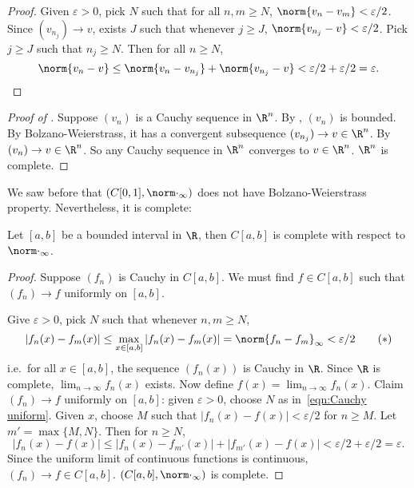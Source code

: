 \documentclass[a4paper]{article}
\theoremstyle{definition}
\begin{document}
\begin{proof}
  Given \(\varepsilon > 0\), pick \(N\) such that for all \(n, m \geq N\), \(\norm{v_n - v_m} < \varepsilon/2\). Since \((v_{n_j}) \to v\), exists \(J\) such that whenever \(j \geq J\), \(\norm{v_{n_j} - v} < \varepsilon/2\). Pick \(j \geq J\) such that \(n_j \geq N\). Then for all \(n\geq N\),
  \[
    \norm{v_n - v} \leq \norm{v_n - v_{n_j}} + \norm{v_{n_j} - v} < \varepsilon/2 + \varepsilon/2 = \varepsilon.
  \]
\end{proof}

\begin{proof}[Proof of ]
  Suppose \((v_n)\) is a Cauchy sequence in \(\R^n\). By , \((v_n)\) is bounded. By Bolzano-Weierstrass, it has a convergent subsequence \((v_{n_j}) \to v \in \R^n\). By  \((v_n) \to v \in \R^n\). So any Cauchy sequence in \(\R^n\) converges to \(v\in \R^n\). \(\R^n\) is complete.
\end{proof}

We saw before that \((C[0, 1], \norm \cdot_\infty)\) does not have Bolzano-Weierstrass property. Nevertheless, it is complete:

\begin{theorem}
  \label{thm:completeness of function space with uniform norm}
  Let \([a, b]\) be a bounded interval in \(\R\), then \(C[a, b]\) is complete with respect to \(\norm \cdot_\infty\).
\end{theorem}

\begin{proof}
  Suppose \((f_n)\) is Cauchy in \(C[a, b]\). We must find \(f\in C[a, b]\) such that \((f_n) \to f\) uniformly on \([a, b]\).

  Give \(\varepsilon > 0\), pick \(N\) such that whenever \(n,m \geq N\),
  \begin{equation*}
    \label{eqn:Cauchy uniform}
    |f_n(x) - f_m(x)| \leq \max_{x \in [a,b]}|f_n(x) - f_m(x)| = \norm{f_n - f_m}_\infty < \varepsilon/2
    \tag{\(\ast\)}
  \end{equation*}
  i.e.\ for all \(x \in [a, b]\), the sequence \((f_n(x))\) is Cauchy in \(\R\). Since \(\R\) is complete, \(\lim_{n \to \infty}f_n(x)\) exists. Now define \(f(x) = \lim_{n \to \infty}f_n(x)\). Claim \((f_n) \to f\) uniformly on \([a, b]\): given \(\varepsilon > 0\), choose \(N\) as in~\eqref{eqn:Cauchy uniform}. Given \(x\), choose \(M\) such that \(|f_n(x) - f(x)| < \varepsilon/2\) for \(n \geq M\). Let \(m' = \max\{M, N\}\). Then for \(n \geq N\),
  \[
    |f_n(x) - f(x)| \leq |f_n(x) - f_{m'}(x)| + |f_{m'}(x) - f(x)| < \varepsilon/2 + \varepsilon/2 = \varepsilon.
  \]
  Since the uniform limit of continuous functions is continuous, \((f_n) \to f \in C[a, b]\). \((C[a, b], \norm \cdot_\infty)\) is complete.
\end{proof}
\end{document}

